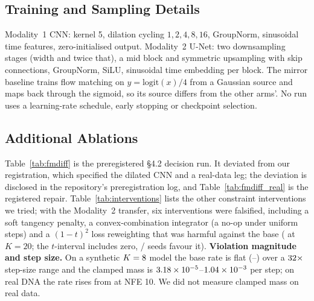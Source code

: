 \documentclass{article}
\begin{document}
\subsection{Training and Sampling Details}
Modality~1 CNN: kernel 5, dilation cycling $1,2,4,8,16$, GroupNorm, sinusoidal time features,
zero-initialised output. Modality~2 U-Net: two downsampling stages (width \MTwoWidth{} and twice
that), a mid block and symmetric upsampling with skip connections, GroupNorm, SiLU, sinusoidal
time embedding per block. The mirror baseline trains flow matching on $y=\mathrm{logit}(x)/4$
from a Gaussian source and maps back through the sigmoid, so its source differs from the other
arms'. No run uses a learning-rate schedule, early stopping or checkpoint selection.

\subsection{Additional Ablations}
\label{app:abl}
Table~\ref{tab:fmdiff} is the preregistered \S4.2 decision run. It deviated from our registration,
which specified the dilated CNN and a real-data leg; the deviation is disclosed in the repository's
preregistration log, and Table~\ref{tab:fmdiff_real} is the registered repair.
Table~\ref{tab:interventions} lists the other constraint interventions we tried; with the
Modality~2 transfer, six interventions were falsified, including a soft tangency penalty, a
convex-combination integrator (a no-op under uniform steps) and a $(1-t)^2$ loss reweighting that
was harmful against the base (\ReweightCIProt{} at $K=20$; the $t$-interval \ReweightProtT{}
includes zero, \ReweightProtPos/\ReweightProtN{} seeds favour it).
\textbf{Violation magnitude and step size.} On a synthetic $K=8$ model the base rate is flat
(\SweepRateLo--\SweepRateHi) over a $32\times$ step-size range and the clamped mass is
$3.18\times10^{-5}$--$1.04\times10^{-3}$ per step; on real DNA the rate rises from \BaseViolDnaTen{} at NFE 10.
We did not measure clamped mass on real data.

\begin{table}[h]
\centering
\caption{The preregistered \S4.2 decision run: synthetic categorical target, small MLP,
\SynSeeds{} seeds. Marginal KL (lower better).}
\label{tab:fmdiff}
\resizebox{\textwidth}{!}{}
\end{table}

\begin{table}[h]
\centering
\caption{Constraint interventions (NFE 100): what each fixes and what it costs.}
\label{tab:interventions}
\small

\end{table}
\end{document}
